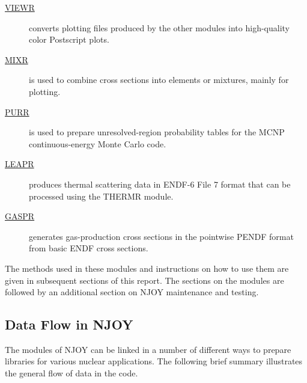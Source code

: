\begin{singlespace}
\begin{description}
\item[\hyperlink{sVIEWRhy}{VIEWR}] converts plotting files produced by the
  other modules into high-quality color Postscript plots.

\item[\hyperlink{sMIXRhy}{MIXR}] is used to combine cross sections into
  elements or mixtures, mainly for plotting.

\item[\hyperlink{sPURRhy}{PURR}] is used to prepare unresolved-region
  probability tables for the MCNP continuous-energy Monte Carlo code.

\item[\hyperlink{sLEAPRhy}{LEAPR}] produces thermal scattering data in ENDF-6
  File 7 format that can be processed using the THERMR module.

\item[\hyperlink{sGASPRhy}{GASPR}] generates gas-production cross sections
  in the pointwise PENDF format from basic ENDF cross sections.
\end{description}
\end{singlespace}

\noindent
The methods used in these modules and instructions on how to use them
are given in subsequent sections of this report.  The sections on the
modules are followed by an additional section on NJOY maintenance
and testing.

\subsection{Data Flow in NJOY}
\label{ssINTRO_dataflow}

The modules of NJOY can be linked in a number of different ways to
prepare libraries for various nuclear applications.  The following
brief summary illustrates the general flow of data in the code.


